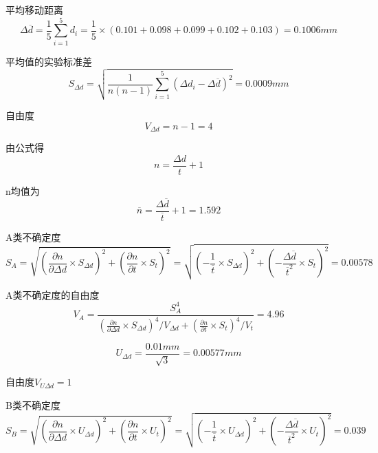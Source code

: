 \documentclass[12pt,a4paper,UTF8]{ctexart}
\begin{document}
平均移动距离
\begin{equation*}
	\varDelta \overline{d}= \frac{1}{5}\sum_{i = 1}^{5}  d_i=\frac{1}{5} \times (0.101 + 0.098 + 0.099 + 0.102 + 0.103)=0.1006mm
\end{equation*} 

平均值的实验标准差
\begin{equation*}
	S_{\varDelta d}=\sqrt{\frac{1}{n(n-1)}\sum_{i = 1}^{5}(\varDelta d_i-\varDelta \overline{d})^{2}} =0.0009mm
\end{equation*}

自由度
\begin{equation*}
	V_{\varDelta d}=n-1=4
\end{equation*}

由公式得
\begin{equation*}
	n=\frac{\varDelta d}{t}+1
\end{equation*}

n均值为
\begin{equation*}
	\overline{n}=\frac{\varDelta\overline{d}}{\overline{t}}+1=1.592
\end{equation*}


A类不确定度
\begin{equation*}
	S_A=\sqrt{{\left( \frac{\partial n}{\partial \varDelta d}\times S_{\varDelta d}\right) }^2+{\left( \frac{\partial n}{\partial t}\times S_{t}\right) }^2}=
	\sqrt{{\left( -\frac{1}{\overline{t}}\times S_{\varDelta d}\right) }^2+{\left( -\frac{\varDelta\overline{d}}{\overline{t}^2}\times S_{t}\right) }^2}=0.00578
\end{equation*}

A类不确定度的自由度
\begin{equation*}
	V_A=\frac{S_A^4}{{\left( \frac{\partial n}{\partial \varDelta d}\times S_{\varDelta d}\right) }^4/V_{\varDelta d}+{\left( \frac{\partial n}{\partial t}\times S_{t}\right) }^4/V_t}=4.96
\end{equation*}

\begin{equation*}
	U_{\varDelta d}=\frac{0.01mm}{\sqrt{3}}=0.00577mm
\end{equation*}

自由度$V_{U \varDelta d}=1$

B类不确定度
\begin{equation*}
	S_B=\sqrt{{\left( \frac{\partial n}{\partial \varDelta d}\times U_{\varDelta d}\right) }^2+{\left( \frac{\partial n}{\partial t}\times U_{t}\right) }^2}=
	\sqrt{{\left( -\frac{1}{\overline{t}}\times U_{\varDelta d}\right) }^2+{\left( -\frac{\varDelta\overline{d}}{\overline{t}^2}\times U_{t}\right) }^2}=0.039
\end{equation*}
\end{document}
